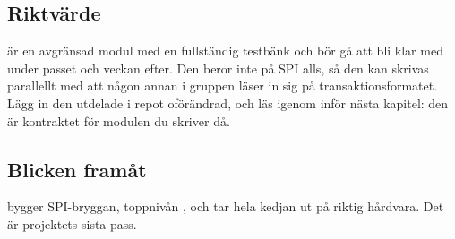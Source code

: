 \subsection*{Riktvärde}
 är en avgränsad modul med en fullständig testbänk och bör gå att bli klar med
under passet och veckan efter. Den beror inte på SPI alls, så den kan skrivas parallellt med att
någon annan i gruppen läser in sig på transaktionsformatet. Lägg in den utdelade
 i repot oförändrad, och läs igenom  inför nästa
kapitel: den är kontraktet för modulen du skriver då.

\subsection*{Blicken framåt}
 bygger SPI-bryggan, toppnivån , och tar hela kedjan ut på riktig
hårdvara. Det är projektets sista pass.
